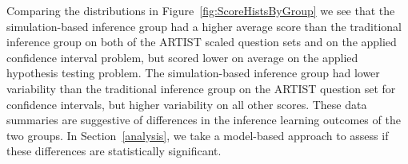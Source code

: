 \documentclass[11pt]{isuthesis}\usepackage[]{graphicx}\usepackage[]{color}
\begin{document}
Comparing the distributions in Figure~\ref{fig:ScoreHistsByGroup} we see that the simulation-based inference group had a higher average score than the traditional inference group on both of the ARTIST scaled question sets and on the applied confidence interval problem, but scored lower on average on the applied hypothesis testing problem.  The simulation-based inference group had lower variability than the traditional inference group on the ARTIST question set for confidence intervals, but higher variability on all other scores. These data summaries are suggestive of differences in the inference learning outcomes of the two groups. In Section~\ref{analysis}, we take a model-based approach to assess if these differences are statistically significant.




% 
% 
%   
\end{document}
